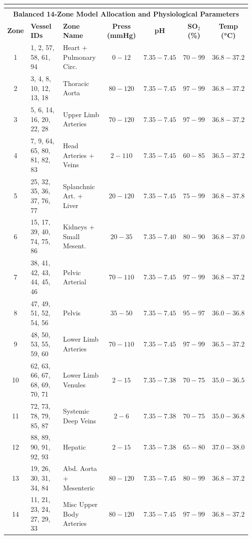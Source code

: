 \documentclass[sigconf]{acmart}
\begin{document}
\begin{table}[htbp]
\begin{tabular}{@{} c p{5.3cm} | l c c c c @{}}
    \multicolumn{7}{c}{} \\ %
    \toprule
    \multicolumn{7}{c}{\textbf{Balanced 14-Zone Model Allocation and Physiological Parameters}} \\
    \midrule
    \textbf{Zone} & \textbf{Vessel IDs} & \textbf{Zone Name} & \textbf{Press (mmHg)} & \textbf{pH} & \textbf{SO$_2$ (\%)} & \textbf{Temp (\si{\degreeCelsius})} \\
    \midrule
    1  & 1, 2, 57, 58, 61, 94 & Heart + Pulmonary Circ. & $0{-}12$ & $7.35{-}7.45$ & $70{-}99$ & $36.8{-}37.2$ \\ 
    2  & 3, 4, 8, 10, 12, 13, 18 & Thoracic Aorta & $80{-}120$ & $7.35{-}7.45$ & $97{-}99$ & $36.8{-}37.2$ \\ 
    3  & 5, 6, 14, 16, 20, 22, 28 & Upper Limb Arteries & $70{-}120$ & $7.35{-}7.45$ & $97{-}99$ & $36.8{-}37.2$ \\ 
    4  & 7, 9, 64, 65, 80, 81, 82, 83 & Head Arteries + Veins & $2{-}110$ & $7.35{-}7.45$ & $60{-}85$ & $36.5{-}37.2$ \\ 
    5  & 25, 32, 35, 36, 37, 76, 77 & Splanchnic Art. + Liver & $20{-}120$ & $7.35{-}7.45$ & $75{-}99$ & $36.8{-}37.8$ \\ 
    6  & 15, 17, 39, 40, 74, 75, 86 & Kidneys + Small Mesent. & $20{-}35$ & $7.35{-}7.40$ & $80{-}90$ & $36.8{-}37.0$ \\ 
    7  & 38, 41, 42, 43, 44, 45, 46 & Pelvic Arterial & $70{-}110$ & $7.35{-}7.45$ & $97{-}99$ & $36.8{-}37.2$ \\ 
    8  & 47, 49, 51, 52, 54, 56 & Pelvis & $35{-}50$ & $7.35{-}7.45$ & $95{-}97$ & $36.0{-}36.8$ \\ 
    9  & 48, 50, 53, 55, 59, 60 & Lower Limb Arteries & $70{-}110$ & $7.35{-}7.45$ & $97{-}99$ & $36.5{-}37.2$ \\ 
    10 & 62, 63, 66, 67, 68, 69, 70, 71 & Lower Limb Venules & $2{-}15$ & $7.35{-}7.38$ & $70{-}75$ & $35.0{-}36.5$ \\ 
    11 & 72, 73, 78, 79, 85, 87 & Systemic Deep Veins & $2{-}6$ & $7.35{-}7.38$ & $70{-}75$ & $35.0{-}36.8$ \\ 
    12 & 88, 89, 90, 91, 92, 93 & Hepatic & $2{-}15$ & $7.35{-}7.38$ & $65{-}80$ & $37.0{-}38.0$ \\ 
    13 & 19, 26, 30, 31, 34, 84 & Abd. Aorta + Mesenteric & $80{-}120$ & $7.35{-}7.45$ & $80{-}99$ & $36.8{-}37.2$ \\ 
    14 & 11, 21, 23, 24, 27, 29, 33 & Misc Upper Body Arteries & $80{-}120$ & $7.35{-}7.45$ & $97{-}99$ & $36.8{-}37.2$ \\
    \bottomrule
    \end{tabular}
\end{table}
\end{document}
